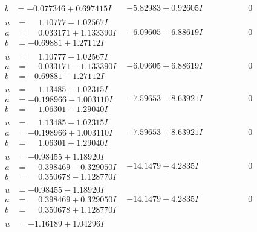 \documentclass[1p]{elsarticle_modified}
\theoremstyle{definition}
\begin{document}
$$\begin{array}{c|c|c}
\begin{aligned}
b &= -0.077346 + 0.697415 I\end{aligned}
 & -5.82983 + 0.92605 I & \phantom{-0.000000 } 0 \\ \hline\begin{aligned}
u &= \phantom{-}1.10777 + 1.02567 I \\
a &= \phantom{-}0.033171 + 1.133390 I \\
b &= -0.69881 + 1.27112 I\end{aligned}
 & -6.09605 - 6.88619 I & \phantom{-0.000000 } 0 \\ \hline\begin{aligned}
u &= \phantom{-}1.10777 - 1.02567 I \\
a &= \phantom{-}0.033171 - 1.133390 I \\
b &= -0.69881 - 1.27112 I\end{aligned}
 & -6.09605 + 6.88619 I & \phantom{-0.000000 } 0 \\ \hline\begin{aligned}
u &= \phantom{-}1.13485 + 1.02315 I \\
a &= -0.198966 - 1.003110 I \\
b &= \phantom{-}1.06301 - 1.29040 I\end{aligned}
 & -7.59653 - 8.63921 I & \phantom{-0.000000 } 0 \\ \hline\begin{aligned}
u &= \phantom{-}1.13485 - 1.02315 I \\
a &= -0.198966 + 1.003110 I \\
b &= \phantom{-}1.06301 + 1.29040 I\end{aligned}
 & -7.59653 + 8.63921 I & \phantom{-0.000000 } 0 \\ \hline\begin{aligned}
u &= -0.98455 + 1.18920 I \\
a &= \phantom{-}0.398469 - 0.329050 I \\
b &= \phantom{-}0.350678 - 1.128770 I\end{aligned}
 & -14.1479 + 4.2835 I & \phantom{-0.000000 } 0 \\ \hline\begin{aligned}
u &= -0.98455 - 1.18920 I \\
a &= \phantom{-}0.398469 + 0.329050 I \\
b &= \phantom{-}0.350678 + 1.128770 I\end{aligned}
 & -14.1479 - 4.2835 I & \phantom{-0.000000 } 0 \\ \hline\begin{aligned}
u &= -1.16189 + 1.04296 I \\

\end{aligned}
\end{array}$$
\end{document}
